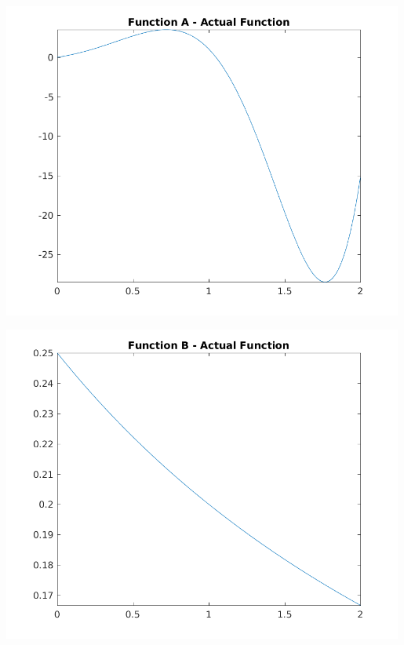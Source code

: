 \documentclass[a4paper]{article}
\begin{document}
 
\begin{center}
    \centering
    \begin{minipage}{0.5\textwidth}
        \centering
        \includegraphics[width=0.99\textwidth]{../output/a_actual.png}
    \end{minipage}\hfill
    \begin{minipage}{0.5\textwidth}
        \centering
        \includegraphics[width=0.99\textwidth]{../output/b_actual.png}
    \end{minipage}
	\label{fig:true}

\end{center}
\end{document}
